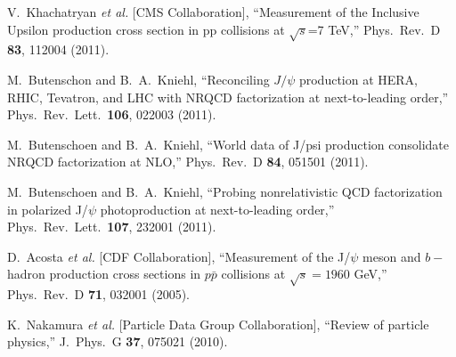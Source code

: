 \documentclass[aps,prc,preprint,superscriptaddress,showpacs,showkeys,amsmath]{revtex4-1}
\begin{document}
\begin{thebibliography}{100}
  V.~Khachatryan {\it et al.}  [CMS Collaboration],
  ``Measurement of the Inclusive Upsilon production cross section in pp collisions at $\sqrt{s}$=7 TeV,''
  Phys.\ Rev.\  D {\bf 83}, 112004 (2011).

  M.~Butenschon and B.~A.~Kniehl,
  ``Reconciling $J/\psi$ production at HERA, RHIC, Tevatron, and LHC with NRQCD factorization at next-to-leading order,''
  Phys.\ Rev.\ Lett.\  {\bf 106}, 022003 (2011).

  M.~Butenschoen and B.~A.~Kniehl,
  ``World data of J/psi production consolidate NRQCD factorization at NLO,''
  Phys.\ Rev.\  D {\bf 84}, 051501 (2011).

  M.~Butenschoen and B.~A.~Kniehl,
  ``Probing nonrelativistic QCD factorization in polarized J/$\psi$ photoproduction at next-to-leading order,''
  Phys.\ Rev.\ Lett.\  {\bf 107}, 232001 (2011).

  D.~Acosta {\it et al.}  [CDF Collaboration],
  ``Measurement of the J/$\psi$ meson and $b-$hadron production cross sections in $p\bar{p}$ collisions at $\sqrt{s} = 1960$ GeV,''
  Phys.\ Rev.\ D {\bf 71}, 032001 (2005).


  K.~Nakamura {\it et al.}  [Particle Data Group Collaboration],
  ``Review of particle physics,''
  J.\ Phys.\ G {\bf 37}, 075021 (2010).



\end{thebibliography}
\end{document}
